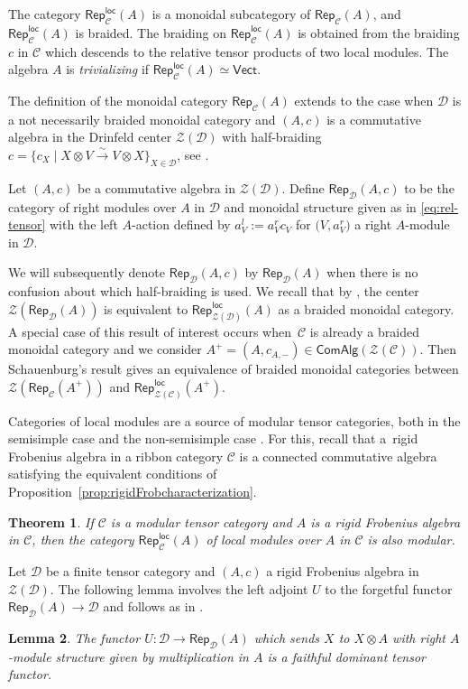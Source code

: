 \documentclass[10pt,a4paper]{amsart}
\numberwithin{equation}{section}
\newtheorem{Theorem}{Theorem}[section]
\newtheorem{Lemma}[Theorem]{Lemma}
\newcommand{\isomorph}{\stackrel{\sim}{\to}}
\newcommand{\ComAlg}{\mathsf{ComAlg}}
\newcommand{\Rep}{\mathsf{Rep}}
\newcommand{\locmod}{\mathsf{Rep}^{\mathsf{loc}}}
\newcommand{\Vect}{\mathsf{Vect}}
\newcommand{\cC}{\mathcal{C}}
\newcommand{\cD}{\mathcal{D}}
\newcommand{\cZ}{\mathcal{Z}}
\begin{document}
The category $\locmod_\cC(A)$ is a monoidal subcategory of $\Rep_\cC(A)$,
and $\locmod_\cC(A)$ is braided.
The braiding on $\locmod_\cC(A)$ is obtained from the braiding $c$ in $\cC$ which descends to the relative tensor products of two local modules. The algebra $A$ is \emph{trivializing} if $\locmod_\cC(A)\simeq \Vect$.

The definition of the monoidal category $\Rep_\cC(A)$ extends to the case when $\cD$ is a not necessarily braided monoidal category and $(A,c)$ is a commutative algebra in the Drinfeld center $\cZ(\cD)$ with half-braiding $c=\{c_X\mid X\otimes V\isomorph V\otimes X\}_{X\in \cD}$, see \cite[Section~4]{Sch}.

\begin{Definition}\label{def:RepA-general}
 Let $(A,c)$ be a commutative algebra in $\cZ(\cD)$. Define $\Rep_\cD(A,c)$ to be the category of right modules over $A$ in $\cD$ and monoidal structure given as in \eqref{eq:rel-tensor} with the left $A$-action defined by
 $a_{V}^l:=a_V^r c_V$ for $\big(V,a_V^r\big)$ a right $A$-module in $\cD$.
\end{Definition}
We will subsequently denote $\Rep_\cD(A,c)$ by $\Rep_{\cD}(A)$ when there is no confusion about which half-braiding is used.
We recall that by \cite[Corollary~4.5]{Sch}, the center $\cZ(\Rep_\cD(A))$ is equivalent to $\locmod_{\cZ(\cD)}(A)$ as a braided monoidal category. A special case of this result of interest occurs when~$\cC$ is already a braided monoidal category and we consider ${A^+=(A,c_{A,-})\in \ComAlg(\cZ(\cC))}$. Then Schauenburg's result gives an equivalence of braided monoidal categories between $\cZ(\Rep_\cC(A^+))$ and $\locmod_{\cZ(\cC)}(A^+)$.

Categories of local modules are a source of modular tensor categories, both in the semisimple case \cite[Theorem~4.5]{KO} and the non-semisimple case \cite[Theorem~4.12]{LW3}. For this, recall that a~rigid Frobenius algebra in a ribbon category $\cC$ is a connected commutative algebra satisfying the equivalent conditions of Proposition~\ref{prop:rigidFrobcharacterization}.

\begin{Theorem}\label{thm:locmodular}
If $\cC$ is a modular tensor category and $A$ is a rigid Frobenius algebra in $\cC$, then the category $\locmod_\cC(A)$ of local modules over $A$ in $\cC$ is also modular.
\end{Theorem}


Let $\cD$ be a finite tensor category and $(A,c)$ a rigid Frobenius algebra in $\cZ(\cD)$. The following lemma involves the left adjoint $U$ to the forgetful functor $\Rep_{\cD}(A)\to \cD$ and follows as in \cite[Lemma~4.5]{LW3}.
\begin{Lemma}\label{lem:U}
 The functor $U\colon \cD\to \Rep_\cD(A)$ which sends $X$ to $X\otimes A$ with right $A$-module structure given by multiplication in $A$ is a faithful dominant tensor functor.
\end{Lemma}
\end{document}
